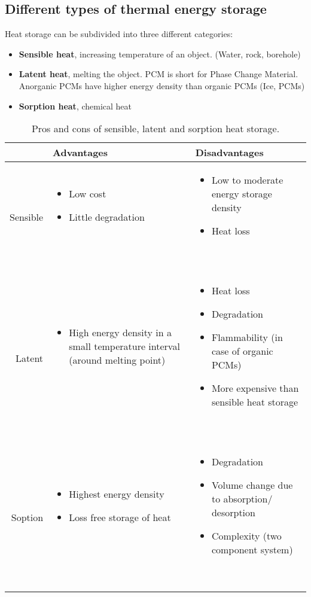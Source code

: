 \documentclass[a4paper,10pt]{article}
\begin{document}
\subsection{Different types of thermal energy storage}
\newcommand{\vb}{\vspace{-0.5cm} \begin{itemize}[noitemsep, leftmargin=0.5cm]}
\newcommand{\ve}{\end{itemize} \vspace{-0.6cm} \ }

Heat storage can be subdivided into three different categories:
\begin{itemize}
 \item \textbf{Sensible heat}, increasing temperature of an object. (Water, rock, borehole) 
 \item \textbf{Latent heat}, melting the object. PCM is short for Phase Change Material. Anorganic PCMs have higher energy density than organic PCMs (Ice, PCMs) 
 \item \textbf{Sorption heat}, chemical heat
\end{itemize}

\begin{table}[ht] \centering
 \begin{tabularx}{0.95\linewidth}{r XX}
  & Advantages & Disadvantages \\ \hline
  Sensible & \vb \item Low cost \item Little degradation \ve  & \vb \item Low to moderate energy storage density \item Heat loss \ve \\
  Latent   & \vb \item High energy density in a small temperature interval (around melting point) \ve & \vb \item Heat loss \item Degradation \item Flammability (in case of organic PCMs) \item More expensive than sensible heat storage \ve \\
  Soption  & \vb \item Highest energy density \item Loss free storage of heat \ve & \vb \item Degradation \item Volume change due to absorption/ desorption \item Complexity (two component system)  \ve \\ \hline
 \end{tabularx}
\caption{Pros and cons of sensible, latent and sorption heat storage.}
\end{table}
\end{document}
